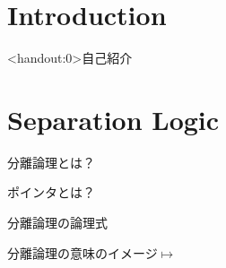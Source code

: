\documentclass[notheorems, aspectratio=169, 12pt, unicode]{beamer}
\begin{document}
\begin{frame}
 \titlepage
\end{frame}

\section{Introduction}

\begin{frame}<handout:0>{自己紹介}
 
\end{frame}

\section{Separation Logic}

\begin{frame}{分離論理とは？}
 
\end{frame}

\begin{frame}{ポインタとは？}
 
\end{frame}

\begin{frame}{分離論理の論理式}
 
\end{frame}

\begin{frame}{分離論理の意味のイメージ}{$\mapsto$}
 
\end{frame}
\end{document}
